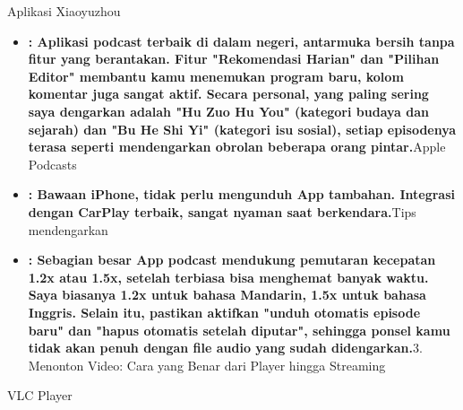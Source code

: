 
Aplikasi Xiaoyuzhou

\begin{itemize}
  \item \textbf{: Aplikasi podcast terbaik di dalam negeri, antarmuka bersih tanpa fitur yang berantakan. Fitur "Rekomendasi Harian" dan "Pilihan Editor" membantu kamu menemukan program baru, kolom komentar juga sangat aktif. Secara personal, yang paling sering saya dengarkan adalah "Hu Zuo Hu You" (kategori budaya dan sejarah) dan "Bu He Shi Yi" (kategori isu sosial), setiap episodenya terasa seperti mendengarkan obrolan beberapa orang pintar.}Apple Podcasts
  \item \textbf{: Bawaan iPhone, tidak perlu mengunduh App tambahan. Integrasi dengan CarPlay terbaik, sangat nyaman saat berkendara.}Tips mendengarkan
  \item \textbf{: Sebagian besar App podcast mendukung pemutaran kecepatan 1.2x atau 1.5x, setelah terbiasa bisa menghemat banyak waktu. Saya biasanya 1.2x untuk bahasa Mandarin, 1.5x untuk bahasa Inggris. Selain itu, pastikan aktifkan "unduh otomatis episode baru" dan "hapus otomatis setelah diputar", sehingga ponsel kamu tidak akan penuh dengan file audio yang sudah didengarkan.}3. Menonton Video: Cara yang Benar dari Player hingga Streaming
\end{itemize}


VLC Player

